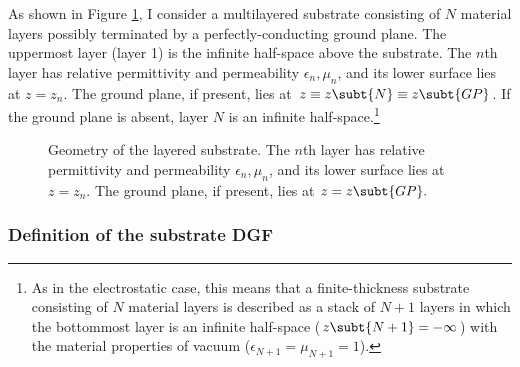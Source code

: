 \documentclass[letterpaper]{article}
\begin{document}
As shown in Figure \ref{SubstrateGeometryFigure}, I consider
a multilayered substrate consisting of $N$ material layers
possibly terminated by a perfectly-conducting ground plane.
The uppermost layer (layer 1) is the infinite half-space
above the substrate.
The $n$th layer
has relative permittivity and permeability $\epsilon_n,\mu_n$,
and its lower surface lies at $z=z_n$.
The ground plane, if present,
lies at $z\equiv z\subt{N}\equiv z\subt{GP}$.
If the ground plane is absent, layer $N$ is an
infinite half-space.\footnote{As in the electrostatic case,
this means that a finite-thickness substrate consisting of
$N$ material layers is described as a stack of $N+1$ layers
in which the bottommost layer is an infinite half-space
($z\subt{N+1}=-\infty$) with the material properties of vacuum
($\epsilon_{N+1}=\mu_{N+1}=1$).}
\begin{figure}[!]
\begin{center}
\caption{Geometry of the layered substrate.
The $n$th layer 
has relative permittivity and permeability $\epsilon_n,\mu_n$,
and its lower surface lies at $z=z_n$. The ground plane, if present,
lies at $z=z\subt{GP}.$
}
\label{SubstrateGeometryFigure}
\end{center}
\end{figure}

\subsubsection*{Definition of the substrate DGF}
\end{document}
